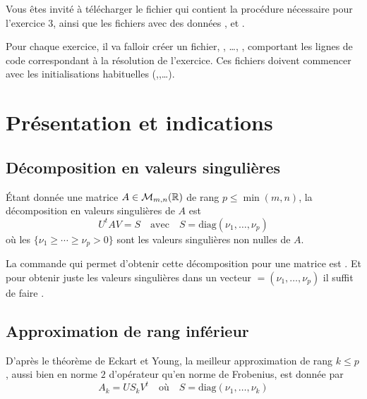 \documentclass[a4paper,12pt,reqno]{amsart}
\begin{document}

Vous êtes invité à télécharger le fichier  qui contient la procédure  nécessaire pour l'exercice 3, ainsi que les fichiers avec des données ,  et .

Pour chaque exercice, il va falloir créer un fichier, , \dots, , comportant les lignes de code correspondant à la résolution de l'exercice. Ces fichiers doivent commencer avec les initialisations habituelles (,,\dots).\\[1ex]

\section{Présentation et indications}

\subsection*{Décomposition en valeurs singulières}

Étant donnée une matrice $A\in{\mathcal M}_{m,n}(\mathbb{R})$ de rang $p\leq \min (m,n)$, la décomposition en valeurs singulières de $A$ est
  $$
    U^tAV = S \quad\text{avec}\quad S = \mbox{diag} (\nu_1, \ldots , \nu_p )
  $$
où les $\{\nu_1 \geq \cdots \geq \nu_p > 0\}$ sont les valeurs singulières non nulles de $A$.

La commande  qui permet d'obtenir cette décomposition pour une matrice  est . Et pour obtenir juste les valeurs singulières dans un vecteur $=(\nu_{1},\ldots,\nu_{p})$ il suffit de faire .

\subsection*{Approximation de rang inférieur}

D'après le théorème de Eckart et Young, la meilleur approximation de rang $k \leq p$, aussi bien en norme $2$ d'opérateur qu'en norme de Frobenius, est donnée par
  $$
    A_{k} = US_{k}V^{t} \quad\text{où}\quad S = \mbox{diag} (\nu_1, \ldots , \nu_k )
  $$
\end{document}
